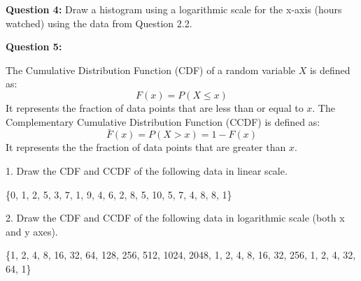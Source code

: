 \documentclass[a4paper, 14pt]{extarticle}
\begin{document}
\begin{center}
\end{center}


{\bf Question 4:} Draw a histogram using a logarithmic scale for the x-axis (hours watched) using the data from Question 2.2.

\newpage

{\bf Question 5:}

\begin{tcolorbox}
The Cumulative Distribution Function (CDF) of a random variable \(X\) is defined as:
\[
F(x) = P(X \leq x)
\]
It represents the fraction of data points that are less than or equal to \(x\).
The Complementary Cumulative Distribution Function (CCDF) is defined as:
\[
\bar{F}(x) = P(X > x) = 1 - F(x)
\]
It represents the the fraction of data points that are greater than \(x\).
\end{tcolorbox}


1. Draw the CDF and CCDF of the following data in linear scale.

\begin{center}
\{0, 1, 2, 5, 3, 7, 1, 9, 4, 6, 2, 8, 5, 10, 5, 7, 4, 8, 8, 1\}
\end{center}

2. Draw the CDF and CCDF of the following data in logarithmic scale (both x and y axes).

\begin{center}
\{1, 2, 4, 8, 16, 32, 64, 128, 256, 512, 1024, 2048, 1, 2, 4, 8, 16, 32, 256, 1, 2, 4, 32, 64, 1\}
\end{center}
\end{document}
